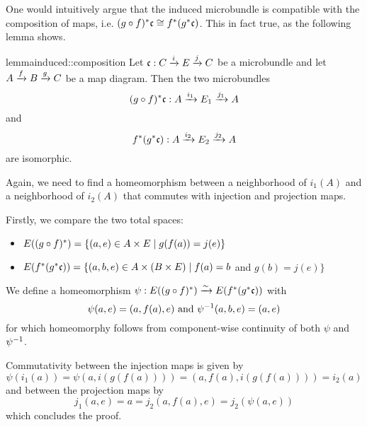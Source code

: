 \begin{myparagraph}
    One would intuitively argue that the induced microbundle is compatible
    with the composition of maps, i.e.
    $\ind{(g \circ f)}\bc \cong \ind{f}(\ind{g}\bc)$.
    This in fact true, as the following lemma shows.
\end{myparagraph}

\begin{mystatement}{lemma}{induced::composition}
    Let $\bundledef{\bc}{C}{E}{i}{j}$ be a microbundle and let $A \xto{f} B \xto{g} C$ be a map diagram.
    Then the two microbundles
    \[ \bundledef{\ind{(g \circ f)}\bc}{A}{E_1}{i_1}{j_1} \]
    and
    \[ \bundledef{\ind{f}(\ind{g}\bc)}{A}{E_2}{i_2}{j_2} \]
    are isomorphic.
\end{mystatement}

\begin{myproof}
    Again, we need to find a homeomorphism between a neighborhood of $i_1(A)$ and a neighborhood of $i_2(A)$
    that commutes with injection and projection maps.
    
    Firstly, we compare the two total spaces:
    \begin{itemize}
        \item $E(\ind{(g \circ f)}) = \{ (a, e) \in A \cross E \mid g(f(a)) = j(e)\}$ 
        \item $E(\ind{f}(\ind{g}\bc)) = \{ (a, b, e) \in A \cross (B \cross E) \mid f(a) = b$ and $ g(b) = j(e) \}$
    \end{itemize}
    We define a homeomorphism $\psi: E(\ind{(g \circ f)}) \isomto E(\ind{f}(\ind{g}\bc))$ with
    \[ \psi(a, e) = (a, f(a), e) \tand \inv{\psi}(a, b, e) = (a, e) \]
    for which homeomorphy follows from component-wise
    continuity of both $\psi$ and $\inv{\psi}$.

    Commutativity between the injection maps is given by
    \[ \psi(i_1(a)) = \psi(a, i(g(f(a)))) = (a, f(a), i(g(f(a)))) = i_2(a) \]
    and between the projection maps by
    \[ j_1(a, e) = a = j_2(a, f(a), e) = j_2(\psi(a, e)) \]
    which concludes the proof.
\end{myproof}